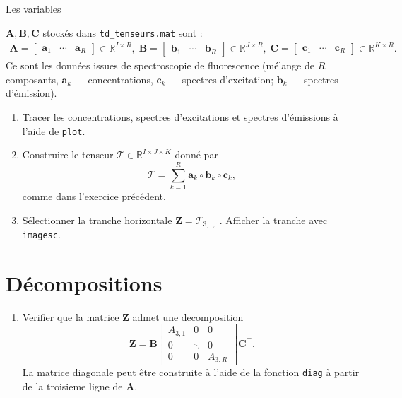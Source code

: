 Les variables {$\mathbf{A}, \mathbf{B}, \mathbf{C}$ stockés dans \lstinline{td_tenseurs.mat}  sont :
\[
\begin{split}
\mathbf{A} = \begin{bmatrix} \mathbf{a}_1 & \cdots & \mathbf{a}_R \end{bmatrix} \in \mathbb{R}^{I \times R},\;
\mathbf{B} = \begin{bmatrix} \mathbf{b}_1 & \cdots & \mathbf{b}_R \end{bmatrix} \in \mathbb{R}^{J \times R},\;
\mathbf{C} = \begin{bmatrix} \mathbf{c}_1 & \cdots & \mathbf{c}_R \end{bmatrix} \in \mathbb{R}^{K \times R}.
\end{split}
\]
Ce sont les données issues de spectroscopie de fluorescence (mélange de $R$ composants, $\mathbf{a}_k$ --- concentrations, $\mathbf{c}_k$ --- spectres d'excitation; $\mathbf{b}_k$ --- spectres d'émission).

\begin{enumerate}
\item Tracer les concentrations, spectres d'excitations et spectres d'émissions à l'aide de {\tt plot}.
\item Construire le tenseur $\mathcal{T} \in \mathbb{R}^{I \times J \times K}$ donné par 
\[
\mathcal{T} = \sum_{k=1}^{R} \mathbf{a}_k \circ  \mathbf{b}_k  \circ  \mathbf{c}_k,
\]
comme dans l'exercice précédent.

\item Sélectionner la tranche horizontale $\mathbf{Z} = \mathcal{T}_{3,:,:}$. Afficher la tranche avec {\tt imagesc}.

\end{enumerate}

\section{Décompositions}
\begin{enumerate}
\item Verifier  que la matrice $\mathbf{Z}$ admet une decomposition
\[
\mathbf{Z} = \mathbf{B} \begin{bmatrix} A_{3,1} & 0 & 0 \\
0 & \ddots & 0 \\ 0&0& A_{3,R}\end{bmatrix}   \mathbf{C}^{\top}.
\]
La matrice diagonale peut être construite à l'aide de la fonction {\tt diag} à partir de la troisieme ligne de $\mathbf{A}$.


\end{enumerate}}
